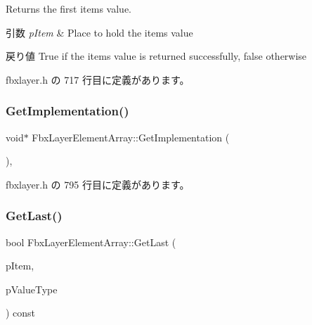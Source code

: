 Returns the first item\textquotesingle{}s value. 
\begin{DoxyParams}{引数}
{\em p\+Item} & Place to hold the item\textquotesingle{}s value \\
\hline
\end{DoxyParams}
\begin{DoxyReturn}{戻り値}
{\ttfamily True} if the item\textquotesingle{}s value is returned successfully, {\ttfamily false} otherwise 
\end{DoxyReturn}


 fbxlayer.\+h の 717 行目に定義があります。

\mbox{\label{class_fbx_layer_element_array_a3b8b773d91de7b18941884a208f90470}} 
\subsubsection{\texorpdfstring{Get\+Implementation()}{GetImplementation()}}
{\footnotesize\ttfamily void$\ast$ Fbx\+Layer\+Element\+Array\+::\+Get\+Implementation (\begin{DoxyParamCaption}{ }\end{DoxyParamCaption})\hspace{0.3cm}{\ttfamily [inline]}, {\ttfamily [protected]}}



 fbxlayer.\+h の 795 行目に定義があります。

\mbox{\label{class_fbx_layer_element_array_a67aeb0dde8b3535d83dcf9eab97e78ae}} 
\subsubsection{\texorpdfstring{Get\+Last()}{GetLast()}\hspace{0.1cm}{\footnotesize\ttfamily [1/2]}}
{\footnotesize\ttfamily bool Fbx\+Layer\+Element\+Array\+::\+Get\+Last (\begin{DoxyParamCaption}\item[{void $\ast$$\ast$}]{p\+Item,  }\item[{\hyperlink{fbxpropertytypes_8h_a73913a5ddfb20e57c6f25e9e6784bd92}{E\+Fbx\+Type}}]{p\+Value\+Type }\end{DoxyParamCaption}) const}

